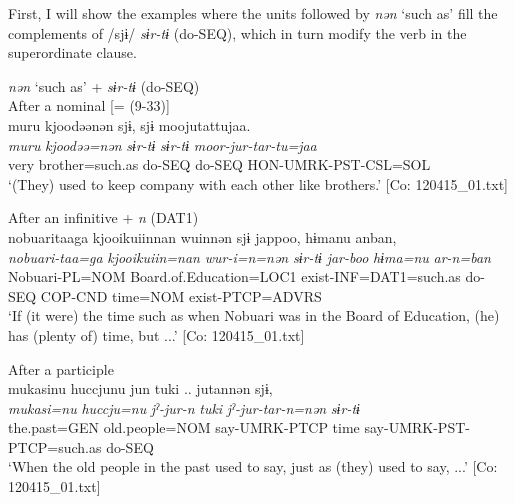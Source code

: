 \begin{xlist}
  First, I will show the examples where the units followed by \textit{nən} ‘such as’ fill the complements of /sjɨ/ \textit{sɨr-tɨ} (do-SEQ), which in turn modify the verb in the superordinate clause.

\ea\label{ex:10.85}   \textit{nən} ‘such as’ + \textit{sɨr-tɨ} (do-SEQ)\\
  \ea After a nominal [= (9-33)]\\
      \glll    muru  kjoodəənən  sjɨ,  sjɨ  moojutattujaa.\\
    \textit{muru}  \textit{kjoodəə=nən}  \textit{sɨr-tɨ}  \textit{sɨr-tɨ}  \textit{moor-jur-tar-tu=jaa}\\
    very  brother=such.as  do-SEQ  do-SEQ  HON-UMRK-PST-CSL=SOL\\
\glt     ‘(They) used to keep company with each other like brothers.’  [Co: 120415\_01.txt]

  \ex After an infinitive + \textit{n} (DAT1)\\
      \glll    nobuaritaaga  {\textbar}kjooikuiin{\textbar}nan  wuinnən  sjɨ  jappoo,  hɨmanu  anban,\\
    \textit{nobuari-taa=ga}  \textit{kjooikuiin=nan}  \textit{wur-i=n=nən}  \textit{sɨr-tɨ}  \textit{jar-boo}  \textit{hɨma=nu}  \textit{ar-n=ban}\\
    Nobuari-PL=NOM  Board.of.Education=LOC1  exist-INF=DAT1=such.as  do-SEQ  COP-CND  time=NOM  exist-PTCP=ADVRS\\
\glt     ‘If (it were) the time such as when Nobuari was in the Board of Education, (he) has (plenty of) time, but ...’  [Co: 120415\_01.txt]

  \ex After a participle\\
      \glll    mukasinu  huccjunu  jun  tuki ..   jutannən  sjɨ,\\
    \textit{mukasi=nu}  \textit{huccju=nu}  \textit{jˀ-jur-n}  \textit{tuki} \textit{jˀ-jur-tar-n=nən}  \textit{sɨr-tɨ}\\
    the.past=GEN  old.people=NOM  say-UMRK-PTCP  time  say-UMRK-PST-PTCP=such.as  do-SEQ\\
\glt     ‘When the old people in the past used to say, just as (they) used to say, ...’  [Co: 120415\_01.txt]


\end{xlist}
